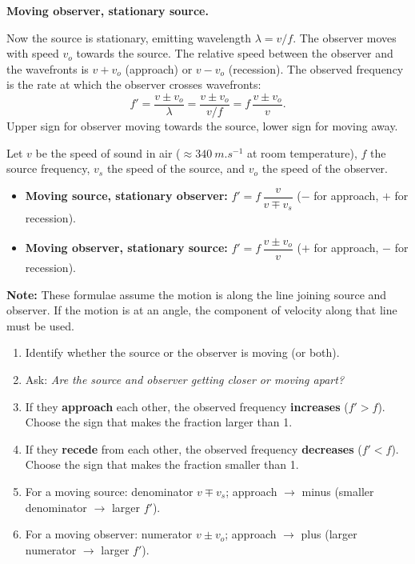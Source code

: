 \documentclass[11pt]{article}
\begin{document}
\textbf{Moving observer, stationary source.}\par
Now the source is stationary, emitting wavelength $\lambda = v/f$. The observer moves with speed $v_o$ towards the source. The relative speed between the observer and the wavefronts is $v + v_o$ (approach) or $v - v_o$ (recession). The observed frequency is the rate at which the observer crosses wavefronts:
\[
f' = \frac{v \pm v_o}{\lambda} = \frac{v \pm v_o}{v/f} = f\,\frac{v \pm v_o}{v}.
\]
Upper sign for observer moving towards the source, lower sign for moving away.

\begin{propriete}
Let $v$ be the speed of sound in air ($\approx \SI{340}{m.s^{-1}}$ at room temperature), $f$ the source frequency, $v_s$ the speed of the source, and $v_o$ the speed of the observer.
\begin{itemize}
\item \textbf{Moving source, stationary observer:} $f' = f\,\dfrac{v}{v \mp v_s}$ \quad ($-$ for approach, $+$ for recession).
\item \textbf{Moving observer, stationary source:} $f' = f\,\dfrac{v \pm v_o}{v}$ \quad ($+$ for approach, $-$ for recession).
\end{itemize}
\textbf{Note:} These formulae assume the motion is along the line joining source and observer. If the motion is at an angle, the component of velocity along that line must be used.
\end{propriete}

\begin{methode}[Choosing the Correct Sign — The ``Approach = Higher Frequency'' Rule]
\begin{enumerate}
\item Identify whether the source or the observer is moving (or both).
\item Ask: \emph{Are the source and observer getting closer or moving apart?}
\item If they \textbf{approach} each other, the observed frequency \textbf{increases} ($f' > f$). Choose the sign that makes the fraction larger than 1.
\item If they \textbf{recede} from each other, the observed frequency \textbf{decreases} ($f' < f$). Choose the sign that makes the fraction smaller than 1.
\item For a moving source: denominator $v \mp v_s$; approach $\rightarrow$ minus (smaller denominator $\rightarrow$ larger $f'$).
\item For a moving observer: numerator $v \pm v_o$; approach $\rightarrow$ plus (larger numerator $\rightarrow$ larger $f'$).
\end{enumerate}
\end{methode}
\end{document}
